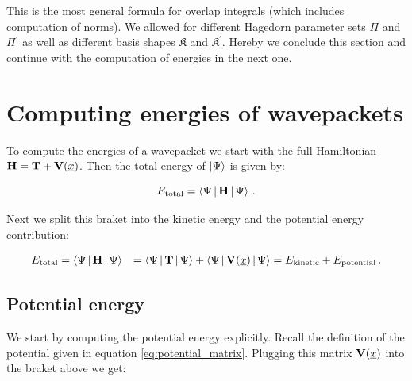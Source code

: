 This is the most general formula for overlap integrals (which includes computation of norms).
We allowed for different Hagedorn parameter sets $\Pi$ and $\Pi^\prime$ as well as different
basis shapes $\mathfrak{K}$ and $\mathfrak{K}^\prime$. Hereby we conclude this section and
continue with the computation of energies in the next one.


\section{Computing energies of wavepackets}


To compute the energies of a wavepacket we start with the full Hamiltonian $\mathbf{H} = \mathbf{T} + \mathbf{V}(\underline{x})$.
Then the total energy of $\Ket{\Psi}$ is given by:

\begin{equation}
  E_{\text{total}} = \Braket{\Psi | \mathbf{H} | \Psi} \,.
\end{equation}

Next we split this braket into the kinetic energy and the potential energy contribution:

\begin{align*}
  E_{\text{total}} & = \Braket{\Psi | \mathbf{H} | \Psi}
                   & = \Braket{\Psi | \mathbf{T} | \Psi} + \Braket{\Psi | \mathbf{V}(\underline{x}) | \Psi}
                     = E_{\text{kinetic}} + E_{\text{potential}} \,.
\end{align*}

\subsection{Potential energy}

We start by computing the potential energy explicitly. Recall the definition of the
potential given in equation \eqref{eq:potential_matrix}. Plugging this matrix
$\mathbf{V}(\underline{x})$ into the braket above we get:

